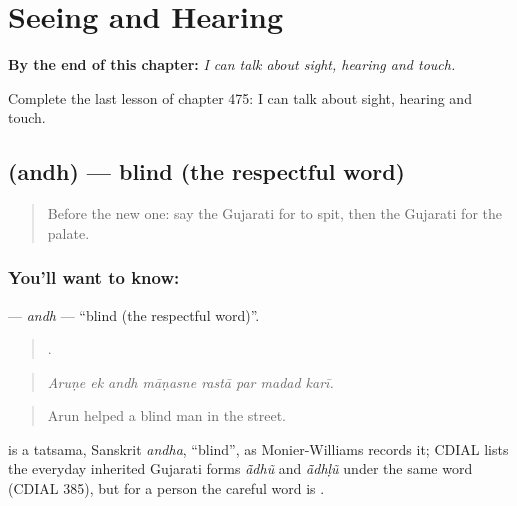 
\chapter{Seeing and Hearing}
\label{ch:gu-seeing-and-hearing}

\begin{chapteropening}
\textbf{By the end of this chapter:} \emph{I can talk about sight, hearing and touch.}

Complete the last lesson of chapter 475: I can talk about sight, hearing and touch.
\end{chapteropening}

\section[\texorpdfstring{\gu{અંધ} (andh)}{અંધ (andh)}]{ (andh) — blind (the respectful word)}

\label{lesson:GU-C475-andh}



\begin{quote}
Before the new one: say the Gujarati for to spit, then the Gujarati for the palate.
\end{quote}

\subsection*{You'll want to know: }
\textbf{} — \emph{andh} — \textquotedblleft{}blind (the respectful word)\textquotedblright{}.

\begin{quote}
       .
\end{quote}

\begin{quote}
\emph{Aruṇe ek andh māṇasne rastā par madad karī.}
\end{quote}

\begin{quote}
Arun helped a blind man in the street.
\end{quote}

\begin{cousinweb}
is a tatsama, Sanskrit \emph{andha}, \textquotedblleft{}blind\textquotedblright{}, as Monier-Williams records it; CDIAL lists the everyday inherited Gujarati forms \emph{ā̃dhũ} and \emph{ā̃dhḷũ} under the same word (CDIAL 385), but for a person the careful word is \textbf{}.
\end{cousinweb}

